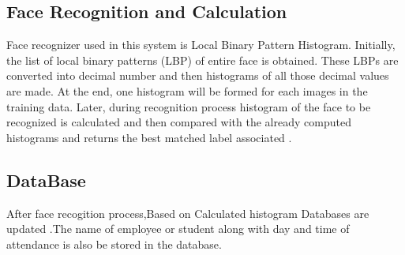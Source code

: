 \subsection{Face Recognition and Calculation}
 Face recognizer  used  in  this  system  is  Local  Binary  Pattern Histogram. Initially, the list of local binary patterns (LBP) of entire  face  is  obtained.  These  LBPs  are  converted  into decimal  number  and  then  histograms  of  all  those  decimal values are made.  At the  end, one  histogram will  be formed for each images in the training data. Later, during recognition process histogram  of the  face to  be recognized  is calculated and then compared with the already computed histograms and returns the  best matched label associated .

 \subsection{DataBase}
 After face recogition process,Based on Calculated histogram Databases are updated .The name of employee or student along with day and time of
attendance is also be stored in the database.
